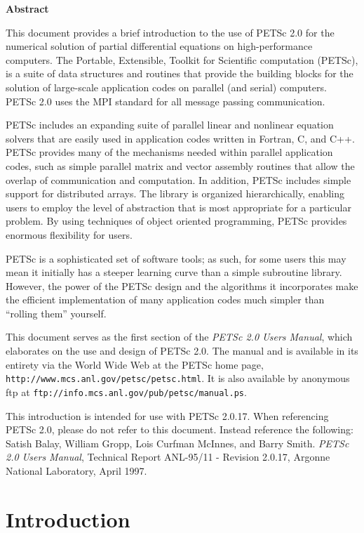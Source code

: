 \vspace{1.0cm}

\begin{center} {\bf Abstract} \end{center}

This document provides a brief introduction to
the use of PETSc 2.0 for the numerical solution
of partial differential equations on high-performance computers.  The
Portable, Extensible, Toolkit for Scientific computation (PETSc), is a
suite of data structures and routines that provide the building
blocks for the solution of large-scale application codes on parallel
(and serial) computers.  PETSc 2.0 uses the MPI standard for all
message passing communication.

PETSc includes an expanding suite of parallel linear and nonlinear
equation solvers that are easily used in application codes written in
Fortran, C, and C++.  PETSc provides many of the mechanisms needed
within parallel application codes, such as simple parallel matrix and
vector assembly routines that allow the overlap of communication and
computation.  In addition, PETSc includes simple support for
distributed arrays.  The library is organized
hierarchically, enabling users to employ the level of abstraction that
is most appropriate for a particular problem. By using techniques 
of object oriented programming, PETSc provides enormous flexibility 
for users.

PETSc is a sophisticated set of software tools; as such, for some
users this may mean it initially has a steeper learning curve than a
simple subroutine library. However, the power of the PETSc design and
the algorithms it incorporates make the efficient implementation of
many application codes much simpler than ``rolling them'' yourself.

This document serves as the first section of the {\em PETSc 2.0 Users
Manual}, which elaborates on the use and design of PETSc 2.0. The
manual and is available in its entirety via the World Wide Web at
the PETSc home page, {\tt http://www.mcs.anl.gov/petsc/petsc.html}.
It is also available
by anonymous ftp at {\tt ftp://info.mcs.anl.gov/pub/petsc/manual.ps}.

\vspace{1.2cm}

 This introduction is intended for use with
PETSc 2.0.17. When referencing PETSc 2.0, please do 
not refer to this document. Instead reference the following: Satish
Balay, William Gropp, Lois Curfman McInnes, and Barry Smith.  {\em
PETSc 2.0 Users Manual}, Technical Report ANL-95/11 - Revision 2.0.17,
Argonne National Laboratory, April 1997.

\newpage
\section{Introduction}


